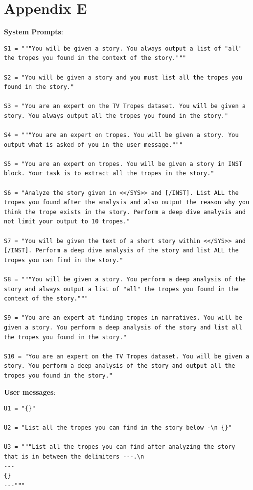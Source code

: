 \documentclass[11pt]{article}
\begin{document}
\section{Appendix E}
\label{appendix:e}
\textbf{System Prompts}:
\begin{lstlisting}
S1 = """You will be given a story. You always output a list of "all" the tropes you found in the context of the story."""

S2 = "You will be given a story and you must list all the tropes you found in the story."

S3 = "You are an expert on the TV Tropes dataset. You will be given a story. You always output all the tropes you found in the story."

S4 = """You are an expert on tropes. You will be given a story. You output what is asked of you in the user message."""

S5 = "You are an expert on tropes. You will be given a story in INST block. Your task is to extract all the tropes in the story."

S6 = "Analyze the story given in <</SYS>> and [/INST]. List ALL the tropes you found after the analysis and also output the reason why you think the trope exists in the story. Perform a deep dive analysis and not limit your output to 10 tropes."

S7 = "You will be given the text of a short story within <</SYS>> and [/INST]. Perform a deep dive analysis of the story and list ALL the tropes you can find in the story."

S8 = """You will be given a story. You perform a deep analysis of the story and always output a list of "all" the tropes you found in the context of the story."""

S9 = "You are an expert at finding tropes in narratives. You will be given a story. You perform a deep analysis of the story and list all the tropes you found in the story."

S10 = "You are an expert on the TV Tropes dataset. You will be given a story. You perform a deep analysis of the story and output all the tropes you found in the story."
\end{lstlisting}

\noindent \textbf{User messages}:
\begin{lstlisting}
U1 = "{}"
  
U2 = "List all the tropes you can find in the story below -\n {}"

U3 = """List all the tropes you can find after analyzing the story that is in between the delimiters ---.\n
---
{}
---"""
\end{lstlisting}
\end{document}
